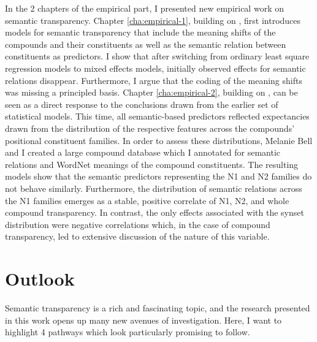 In the 2 chapters of the empirical part, I presented new empirical
work on semantic transparency. Chapter \ref{cha:empirical-1}, building
on \citet{BellandSchaefer:2013}, first introduces models for semantic
transparency that include the meaning shifts of the compounds and
their constituents as well as the semantic relation between
constituents as predictors. I show that after switching from ordinary
least square regression models to mixed effects models, initially
observed effects
for semantic relations disappear. Furthermore, I
argue that the coding of the meaning shifts was missing a
principled basis. Chapter \ref{cha:empirical-2}, building
on \citet{BellandSchaefer:2016}, can be seen as a direct response to
the conclusions drawn from the earlier set of statistical
models. This time, all semantic-based predictors reflected
expectancies drawn from the distribution of the respective features
across the compounds' positional constituent families. In order to
assess these distributions, Melanie Bell and I created a large
compound database which I annotated for semantic relations and WordNet
meanings of the compound constituents. The resulting models show that
the semantic predictors representing the N1 and N2 families do not
behave similarly. Furthermore, the distribution of semantic relations
across the N1 families emerges as a stable, positive correlate of N1,
N2, and whole compound transparency. In contrast, the only effects
associated with the synset distribution were negative correlations
which, in the case of compound transparency, led to extensive
discussion of the nature of this variable. 

\section{Outlook}
\label{sec:outlook}

Semantic transparency is a rich and fascinating topic, and the
research presented in this work opens up many new avenues of
investigation. Here, I want to highlight 4 pathways which look
particularly promising to follow.

